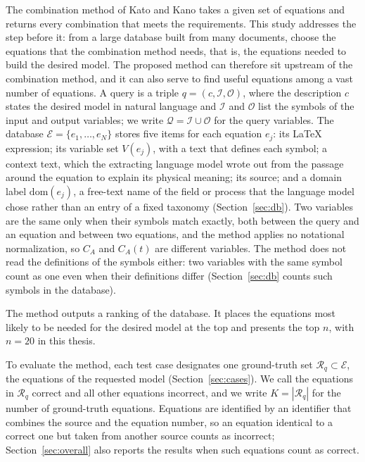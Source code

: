 The combination method of Kato and Kano takes a given set of equations and returns every
combination that meets the requirements. This study addresses the step before it: from a large
database built from many documents, choose the equations that the combination method needs, that
is, the equations needed to build the desired model. The proposed method can therefore sit
upstream of the combination method, and it can also serve to find useful equations among a vast
number of equations.
A query is a triple $q = (c, \mathcal{I}, \mathcal{O})$, where the description $c$ states the
desired model in natural language and $\mathcal{I}$ and $\mathcal{O}$ list the symbols of the
input and output variables; we write $\mathcal{Q} = \mathcal{I} \cup \mathcal{O}$ for the query
variables. The database $\mathcal{E} = \{e_1, \dots, e_N\}$ stores five items for each equation
$e_j$: its \LaTeX{} expression; its variable set $V(e_j)$, with a text that defines each symbol; a
context text, which the extracting language model wrote out from the passage around the equation
to explain its physical meaning; its source; and a domain label $\mathrm{dom}(e_j)$, a free-text
name of the field or process that the language model chose rather than an entry of a fixed
taxonomy (Section~\ref{sec:db}). Two variables are the same only
when their symbols match exactly, both between the query and an equation and between two
equations, and the method applies no notational normalization, so $C_A$ and $C_A(t)$ are
different variables. The method does not read the definitions of the symbols either: two
variables with the same symbol count as one even when their definitions differ
(Section~\ref{sec:db} counts such symbols in the database).

The method outputs a ranking of the database. It places the equations most likely to be needed
for the desired model at the top and presents the top $n$, with $n = 20$ in this thesis.

To evaluate the method, each test case designates one ground-truth set
$\mathcal{R}_q \subset \mathcal{E}$, the equations of the requested model
(Section~\ref{sec:cases}). We call the equations in $\mathcal{R}_q$ correct and all other
equations incorrect, and we write $K = |\mathcal{R}_q|$ for the number of ground-truth equations.
Equations are identified by an identifier that combines the source and the equation number, so an
equation identical to a correct one but taken from another source counts as incorrect;
Section~\ref{sec:overall} also reports the results when such equations count as correct.

